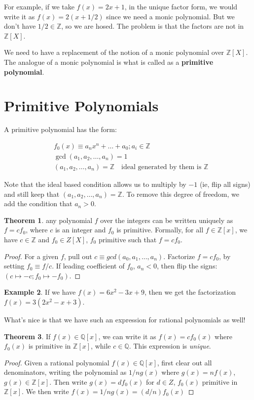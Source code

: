 \documentclass{book}
\newcommand{\Z}{\ensuremath{\mathbb{Z}}}
\newcommand{\Q}{\ensuremath{\mathbb{Q}}}
\theoremstyle{definition}
\newtheorem{theorem}{Theorem}
\newtheorem{example}[theorem]{Example}
\begin{document}
For example, if we take $f(x) = 2x+1$, in the unique factor form, we would
write it as $f(x) = 2(x + 1/2)$ since we need a monic polynomial. But we
don't have $1/2 \in \Z$, so we are hosed. The problem is that the factors
are not in $\Z[X]$.

We need to have a replacement of the notion of a monic polynomial over $\Z[X]$.
The analogue of a monic polynomial is what is called as a \textbf{primitive polynomial}.

\section{Primitive Polynomials}
A primitive polynomial has the form:

\begin{align*}
&f_0(x) \equiv  a_n x^n + \dots + a_0 ; a_i \in \Z \\
&\gcd(a_1, a_2, \dots, a_n) = 1 \\
&(a_1, a_2, \dots, a_n) = \Z \quad \text{ideal generated by them is $\Z$}
\end{align*}

Note that the ideal based condition allows us to multiply by $-1$ (ie, flip all signs) 
and still keep that $(a_1, a_2, \dots, a_n) = \Z$. To remove this degree of
freedom, we add the condition that $a_n > 0$.

\begin{theorem}
any polynomial $f$ over the integers can be written uniquely
as $f = c f_0$, where $c$ is an integer and $f_0$ is primitive. Formally,
for all $f \in \Z[x]$, we have $c \in \Z$ and $f_0 \in Z[X]$, $f_0$ primitive
such that $f = c f_0$.
\end{theorem}
\begin{proof}
    For a given $f$, pull out $c \equiv gcd(a_0, a_1, \dots, a_n)$. Factorize
    $f = c f_0$, by setting $f_0 \equiv f / c$. If leading coefficient of
    $f_0$, $a_n < 0$, then flip the signs: $(c \mapsto -c; f_0 \mapsto -f_0)$.
\end{proof}

\begin{example}
    If we have $f(x) = 6x^2 - 3x + 9$, then we get the factorization
    $f(x) = 3(2x^2 - x + 3)$.
\end{example}

What's nice is that we have such an expression for rational polynomials
as well! 

\begin{theorem}
If $f(x) \in \Q[x]$, we can write it as $f(x) = c f_0(x)$ where
$f_0(x)$ is primitive in $\Z[x]$, while $c \in \Q$. This expression is
\emph{unique}.
\end{theorem}
\begin{proof}
    Given a rational polynomial $f(x) \in \Q[x]$, first clear out all denominators,
    writing the polynomial as $1/n g(x)$ where $g(x) = nf(x)$, $g(x) \in \Z[x]$.
    Then write $g(x) = d f_0(x)$ for $d \in Z$, $f_0(x)$ primitive in $\Z[x]$.
    We then write $f(x) = 1/n g(x) = (d/n) f_0(x)$
\end{proof}
\end{document}
